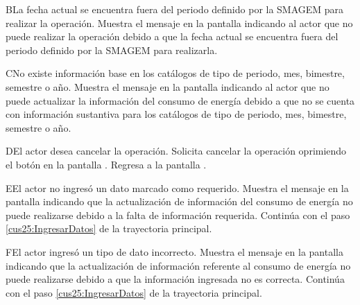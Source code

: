  \begin{UCtrayectoriaA}{B}{La fecha actual se encuentra fuera del periodo definido por la SMAGEM para realizar la operación.}
    \UCpaso[\UCsist] Muestra el mensaje  en la pantalla  indicando al actor que no puede realizar la operación debido a que la fecha actual se encuentra fuera del periodo definido por la SMAGEM para realizarla. 
 \end{UCtrayectoriaA}
 
  \begin{UCtrayectoriaA}{C}{No existe información base en los catálogos de tipo de periodo, mes, bimestre, semestre o año.}
    \UCpaso[\UCsist] Muestra el mensaje  en la pantalla  indicando al actor que no puede actualizar la información del consumo de energía debido a que no se cuenta con información sustantiva para los catálogos de tipo de periodo, mes, bimestre, semestre o año.
 \end{UCtrayectoriaA}
 
    \begin{UCtrayectoriaA}{D}{El actor desea cancelar la operación.}
    \UCpaso[\UCactor] Solicita cancelar la operación oprimiendo el botón  en la pantalla .
    \UCpaso[] Regresa a la pantalla . 
    \end{UCtrayectoriaA}
  
    \begin{UCtrayectoriaA}{E}{El actor no ingresó un dato marcado como requerido.}    
    \UCpaso[\UCsist] Muestra el mensaje  en la pantalla  indicando que la actualización de información del consumo de energía no puede realizarse debido a la falta de información requerida.
    \UCpaso[] Continúa con el paso \ref{cus25:IngresarDatos} de la trayectoria principal.     
    \end{UCtrayectoriaA}
 
        \begin{UCtrayectoriaA}{F}{El actor ingresó un tipo de dato incorrecto.}    
    \UCpaso[\UCsist] Muestra el mensaje  en la pantalla  indicando que la actualización de información referente al consumo de energía no puede realizarse debido a que la información ingresada no es correcta.
    \UCpaso[] Continúa con el paso \ref{cus25:IngresarDatos} de la trayectoria principal.     
    \end{UCtrayectoriaA}
    

